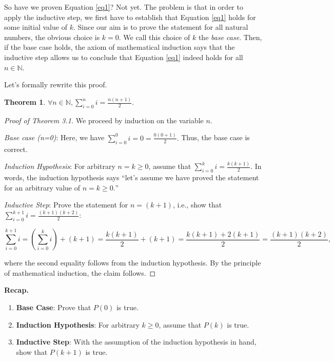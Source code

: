 \documentclass[12pt,a4paper]{article}
\newtheorem{theorem}{Theorem}[section]
\theoremstyle{definition}
\begin{document}
\bigbreak

So have we proven Equation \eqref{eq1}? Not yet. The problem is that in order to apply the inductive step, we first have to establish that Equation \eqref{eq1} holds for some initial value of $k$. Since our aim is to prove the statement for all natural numbers, the obvious choice is $k=0.$ We call this choice of $k$ the \textit{base case}. Then, if the base case holds, the axiom of mathematical induction says that the inductive step allows us to conclude that Equation \eqref{eq1} indeed holds for all $n\in\mathbb{N}$.

\bigbreak

Let's formally rewrite this proof.

\begin{theorem}
$\displaystyle\forall n\in\mathbb{N},\sum_{i=0}^{n}i=\frac{n(n+1)}{2}.$
\end{theorem}

\begin{proof}[Proof of Theorem 3.1]
We proceed by induction on the variable $n$.

\bigbreak

\textit{Base case (n=0)}: Here, we have $\displaystyle\sum_{i=0}^{0}i=0=\frac{0(0+1)}{2}.$ Thus, the base case is correct.

\bigbreak

\textit{Induction Hypothesis}: For arbitrary $n=k\geq0$, assume that $\displaystyle\sum_{i=0}^{k}i=\frac{k(k+1)}{2}$. In words, the induction hypothesis says ``let's assume we have proved the statement for an arbitrary value of $n=k\geq0.$''

\bigbreak

\textit{Inductive Step}: Prove the statement for $n=(k+1)$, i.e., show that $\displaystyle\sum_{i=0}^{k+1}i=\frac{(k+1)(k+2)}{2}$:

\begin{equation}\label{eq3}
\sum_{i=0}^{k+1}i=\left(\sum_{i=0}^{k}i\right)+(k+1)=\frac{k(k+1)}{2}+(k+1)=\frac{k(k+1)+2(k+1)}{2}=\frac{(k+1)(k+2)}{2},
\end{equation}

where the second equality follows from the induction hypothesis. By the principle of mathematical induction, the claim follows.
\end{proof}

\textbf{Recap.} \\
\begin{enumerate}
\item \textbf{Base Case}: Prove that $P(0)$ is true. \\
\item \textbf{Induction Hypothesis}: For arbitrary $k\geq0$, assume that $P(k)$ is true. \\
\item \textbf{Inductive Step}: With the assumption of the induction hypothesis in hand, show that $P(k+1)$ is true.
\end{enumerate}
\end{document}
